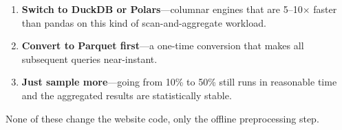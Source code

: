 \documentclass[11pt,a4paper]{article}
\begin{document}
\begin{enumerate}[leftmargin=1.5em, itemsep=2pt]
  \item \textbf{Switch to DuckDB or Polars}---columnar engines that are 5--10$\times$ faster than pandas on this kind of scan-and-aggregate workload.
  \item \textbf{Convert to Parquet first}---a one-time conversion that makes all subsequent queries near-instant.
  \item \textbf{Just sample more}---going from 10\% to 50\% still runs in reasonable time and the aggregated results are statistically stable.
\end{enumerate}

None of these change the website code, only the offline preprocessing step.
\end{document}
